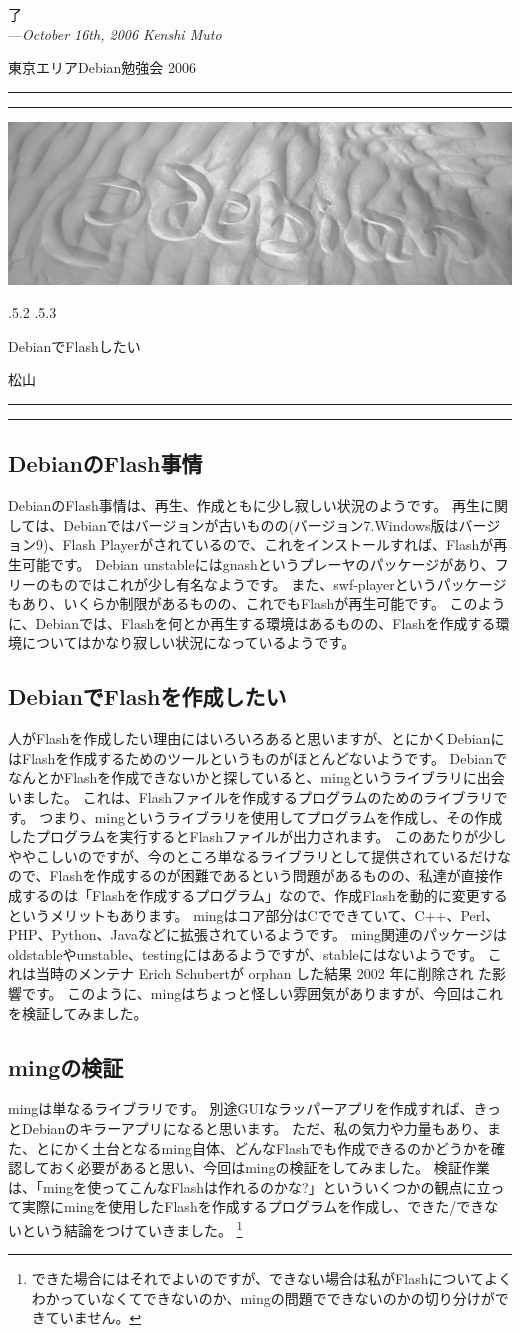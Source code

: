 \documentclass[mingoth,a4paper]{jsarticle}
\makeatletter
\renewcommand{\section}{\@startsection{section}{1}{\z@}%
    {\Cvs \@plus.5\Cdp \@minus.2\Cdp}%
    {.5\Cvs \@plus.3\Cdp}%
    {\normalfont\Huge\headfont\raggedright\centering}} %
\newcommand{\dancersection}[2]{%
\newpage
東京エリアDebian勉強会 2006
\hrule
\vspace{0.5mm}
\hrule
\hfill{}\includegraphics[width=16cm]{image2006-natsu/guruguru-sand-light.png}\\
\vspace{-5cm}
\begin{center}
\section{#1}
\end{center}
\hfill{}\colorbox{white}{#2}\hspace{3cm}\space\\
\vspace{1cm}
\hrule
\vspace{0.5mm}
\hrule
\vspace{1cm}
}
\makeatother
\begin{document}
\begin{flushright}
  了\\
  ---\emph{October 16th, 2006 Kenshi Muto}
\end{flushright}



\dancersection{DebianでFlashしたい}{松山}

\subsection{DebianのFlash事情}
DebianのFlash事情は、再生、作成ともに少し寂しい状況のようです。
再生に関しては、Debianではバージョンが古いものの(バージョン7.Windows版はバージョン9)、Flash Playerがされているので、これをインストールすれば、Flashが再生可能です。
Debian unstableにはgnashというプレーヤのパッケージがあり、フリーのものではこれが少し有名なようです。
また、swf-playerというパッケージもあり、いくらか制限があるものの、これでもFlashが再生可能です。
このように、Debianでは、Flashを何とか再生する環境はあるものの、Flashを作成する環境についてはかなり寂しい状況になっているようです。

\subsection{DebianでFlashを作成したい}
人がFlashを作成したい理由にはいろいろあると思いますが、とにかくDebianにはFlashを作成するためのツールというものがほとんどないようです。
DebianでなんとかFlashを作成できないかと探していると、mingというライブラリに出会いました。
これは、Flashファイルを作成するプログラムのためのライブラリです。
つまり、mingというライブラリを使用してプログラムを作成し、その作成したプログラムを実行するとFlashファイルが出力されます。
このあたりが少しややこしいのですが、今のところ単なるライブラリとして提供されているだけなので、Flashを作成するのが困難であるという問題があるものの、私達が直接作成するのは「Flashを作成するプログラム」なので、作成Flashを動的に変更するというメリットもあります。
mingはコア部分はCでできていて、C++、Perl、PHP、Python、Javaなどに拡張されているようです。
ming関連のパッケージはoldstableやunstable、testingにはあるようですが、stableにはないようです。
これは当時のメンテナ Erich Schubertが orphan した結果 2002 年に削除され
た影響です。
このように、mingはちょっと怪しい雰囲気がありますが、今回はこれを検証してみました。

\subsection{mingの検証}
mingは単なるライブラリです。
別途GUIなラッパーアプリを作成すれば、きっとDebianのキラーアプリになると思います。
ただ、私の気力や力量もあり、また、とにかく土台となるming自体、どんなFlashでも作成できるのかどうかを確認しておく必要があると思い、今回はmingの検証をしてみました。
検証作業は、「mingを使ってこんなFlashは作れるのかな?」といういくつかの観点に立って実際にmingを使用したFlashを作成するプログラムを作成し、できた/できないという結論をつけていきました。
\footnote{できた場合にはそれでよいのですが、できない場合は私がFlashについてよくわかっていなくてできないのか、mingの問題でできないのかの切り分けができていません。}
\end{document}

